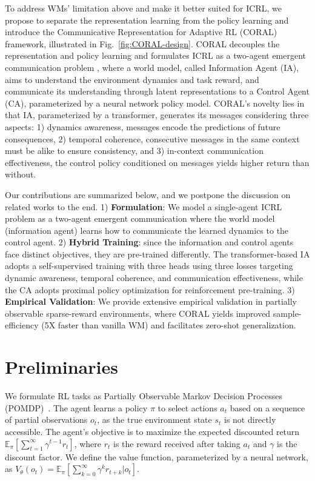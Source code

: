 \documentclass[letterpaper]{article} %
\newcommand{\E}{\mathbb{E}}
\begin{document}
To address WMs' limitation above and make it better suited for ICRL, we propose to separate the representation learning from the policy learning and introduce the Communicative Representation for Adaptive RL (CORAL) framework, illustrated in Fig.~\ref{fig:CORAL-design}. CORAL decouples the representation and policy learning and formulates ICRL as a two-agent emergent communication problem \cite{lowe2019pitfalls, zhu2024survey}, where a world model, called Information Agent (IA), aims to understand the environment dynamics and task reward, and communicate its understanding through latent representations to a Control Agent (CA), parameterized by a neural network policy model. CORAL's novelty lies in that IA, parameterized by a transformer, generates its messages considering three aspects: 1) dynamics awareness, messages encode the predictions of future consequences, 2) temporal coherence, consecutive messages in the same context must be alike to ensure consistency, and 3) in-context communication effectiveness, the control policy conditioned on messages yields higher return than without. 

Our contributions are summarized below, and we postpone the discussion on related works to the end. 1) \textbf{Formulation}: We model a single-agent ICRL problem as a two-agent emergent communication where the world model (information agent) learns how to communicate the learned dynamics to the control agent. 2) \textbf{Hybrid Training}: since the information and control agents face distinct objectives, they are pre-trained differently. The transformer-based IA adopts a self-supervised training with three heads using three losses targeting dynamic awareness, temporal coherence, and communication effectiveness, while the CA adopts proximal policy optimization for reinforcement pre-training. 3) \textbf{Empirical Validation}: We provide extensive empirical validation in partially observable sparse-reward environments, where CORAL yields improved sample-efficiency (5X faster than vanilla WM) and facilitates zero-shot generalization. 




\section{Preliminaries}
We formulate RL tasks as Partially Observable Markov Decision Processes (POMDP)~\cite{kaelbling1998planning}. The agent learns a policy $\pi$ to select actions $a_t$ based on a sequence of partial observations $o_t$, as the true environment state $s_t$ is not directly accessible. The agent's objective is to maximize the expected discounted return $\E_{\pi}[\sum_{t=1}^\infty\gamma^{t-1} r_{t}]$, where $r_t$ is the reward received after taking $a_t$ and $\gamma$ is the discount factor. We define the value function, parameterized by a neural network, as  $V_\theta(o_t) =\E_{\pi}[\sum_{k=0}^\infty \gamma^{k}r_{t+k}|o_t ]$. 
\end{document}

